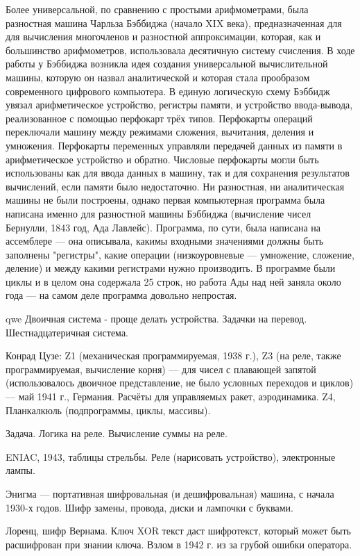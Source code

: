 \documentclass{book}
\begin{document}
Более универсальной, по сравнению с простыми арифмометрами, была разностная машина Чарльза Бэббиджа
(начало XIX века), предназначенная для для вычисления многочленов и разностной аппроксимации,
которая, как и большинство арифмометров, использовала десятичную систему счисления. В
ходе работы у Бэббиджа возникла идея создания универсальной вычислительной машины, которую он
назвал аналитической и которая стала прообразом современного цифрового компьютера. В единую
логическую схему Бэббидж увязал арифметическое устройство, регистры
памяти, и устройство ввода-вывода, реализованное с помощью
перфокарт трёх типов. Перфокарты операций переключали машину между режимами сложения, вычитания,
деления и умножения. Перфокарты переменных управляли передачей данных из памяти в арифметическое
устройство и обратно. Числовые перфокарты могли быть использованы как для ввода данных в машину,
так и для сохранения результатов вычислений, если памяти было недостаточно. Ни разностная, ни
аналитическая машины не были построены, однако первая компьютерная программа была написана именно
для разностной машины Бэббиджа (вычисление чисел Бернулли, 1843 год, Ада Лавлейс). Программа, по
сути, была написана на ассемблере --- она описывала, какимы входными значениями должны быть
заполнены "регистры", какие операции (низкоуровневые --- умножение, сложение, деление) и между
какими регистрами нужно производить. В программе были циклы и в целом она содержала 25 строк, но
работа Ады над ней заняла около года --- на самом деле программа довольно непростая.

qwe
Двоичная система - проще делать устройства. Задачки на перевод. Шестнадцатеричная система.

Конрад Цузе: Z1 (механическая программируемая, 1938 г.), Z3 (на реле, также
программируемая, вычисление корня) --- для чисел с плавающей запятой
(использовалось двоичное представление, не было условных переходов и циклов) ---
май 1941 г., Германия. Расчёты для управляемых ракет, аэродинамика. Z4,
Планкалкюль (подпрограммы, циклы, массивы).

Задача. Логика на реле. Вычисление суммы на реле.

ENIAC, 1943, таблицы стрельбы. Реле (нарисовать устройство), электронные лампы.

Энигма --- портативная шифровальная (и дешифровальная) машина, с начала 1930-х
годов. Шифр замены, провода, диски и лампочки с буквами.

Лоренц, шифр Вернама. Ключ XOR текст даст шифротекст, который может быть
расшифрован при знании ключа. Взлом в 1942 г. из за грубой ошибки оператора.
\end{document}
